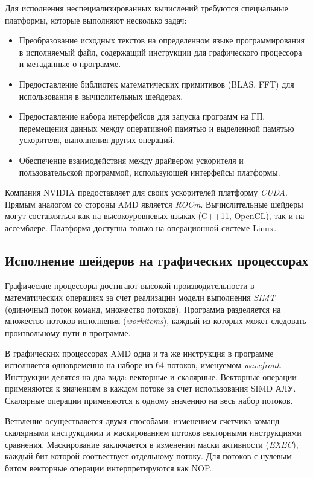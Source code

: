 \documentclass[a4paper,14pt]{extarticle}
\newenvironment{ul}{\begin{itemize}[noitemsep,topsep=0em]}{\end{itemize}\vspace{20pt}}
\begin{document}
Для исполнения неспециализированных вычислений требуются специальные платформы,
которые выполняют несколько задач:
\begin{ul}
\item Преобразование исходных текстов на определенном языке программирования
  в исполняемый файл, содержащий инструкции для графического процессора и метаданные о программе.
\item Предоставление библиотек математических примитивов (BLAS, FFT)
  для использования в вычислительных шейдерах.
\item Предоставление набора интерфейсов для запуска программ на ГП, перемещения данных между
  оперативной памятью и выделенной памятью ускорителя, выполнения других операций.
\item Обеспечение взаимодействия между драйвером ускорителя и пользовательской программой,
  использующей интерфейсы платформы.
\end{ul}

Компания NVIDIA предоставляет для своих ускорителей платформу \textit{CUDA}. Прямым аналогом
со стороны AMD является \textit{ROCm}. Вычислительные шейдеры могут составляться как
на высокоуровневых языках (C++11, OpenCL), так и на ассемблере. Платформа доступна
только на операционной системе Linux.

\subsection{Исполнение шейдеров на графических процессорах}

Графические процессоры достигают высокой производительности в математических операциях
за счет реализации модели выполнения \textit{SIMT} (одиночный поток команд, множество потоков).
Программа разделяется на множество потоков исполнения (\textit{workitems}),
каждый из которых может следовать произвольному пути в программе.

В графических процессорах AMD одна и та же инструкция в программе исполняется одновременно
на наборе из 64 потоков, именуемом \textit{wavefront}. Инструкции делятся на два вида:
векторные и скалярные. Векторные операции применяются к значениям в каждом потоке
за счет использования SIMD АЛУ. Скалярные операции применяются к одному значению на весь набор
потоков.

Ветвление осуществляется двумя способами: изменением счетчика команд скалярными инструкциями
и маскированием потоков векторными инструкциями сравнения. Маскирование заключается в изменении
маски активности (\textit{EXEC}), каждый бит которой соотвествует отдельному потоку.
Для потоков с нулевым битом векторные операции интерпретируются как NOP.
\end{document}
